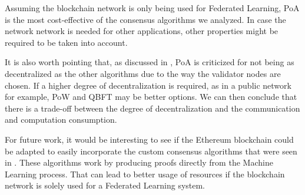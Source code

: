 Assuming the blockchain network is only being used for Federated Learning, PoA is the most cost-effective of the consensus algorithms we analyzed. In case the network network is needed for other applications, other properties might be required to be taken into account.

It is also worth pointing that, as discussed in , PoA is criticized for not being as decentralized as the other algorithms due to the way the validator nodes are chosen. If a higher degree of decentralization is required, as in a public network for example, PoW and QBFT may be better options. We can then conclude that there is a trade-off between the degree of decentralization and the communication and computation consumption.

For future work, it would be interesting to see if the Ethereum blockchain could be adapted to easily incorporate the custom consensus algorithms that were seen in . These algorithms work by producing proofs directly from the Machine Learning process. That can lead to better usage of resources if the blockchain network is solely used for a Federated Learning system.